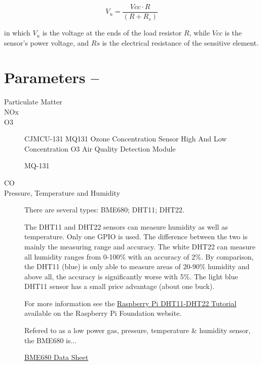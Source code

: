 \documentclass{article}\usepackage[]{graphicx}\usepackage[]{color}
\begin{document}
\begin{equation} 
V_u = \frac{Vcc \cdot R}{(R+R_s)}
\end{equation}
 
in which $V_u$ is the voltage at the ends of the load resistor $R$, while $Vcc$ is the sensor's power voltage, and $Rs$ is the electrical resistance of the sensitive element.

\section{Parameters -- }

\begin{description}

\item[Particulate Matter]

\item[NOx]

\item[O3]

CJMCU-131 MQ131 Ozone Concentration Sensor High And Low Concentration O3 Air Quality Detection Module 

MQ-131

\item[CO]

\item[Pressure, Temperature and Humidity]

There are several types: BME680; DHT11; DHT22.


The DHT11 and DHT22 sensors can measure humidity as well as temperature. Only one GPIO is used. The difference between the two is mainly the measuring range and accuracy. The white DHT22 can measure all humidity ranges from 0-100\% with an accuracy of 2\%. By comparison, the DHT11 (blue) is only able to measure areas of 20-90\% humidity and above all, the accuracy is significantly worse with 5\%. The light blue DHT11 sensor has a small price advantage (about one buck).

For more information see the \href{https://tutorials-raspberrypi.com/raspberry-pi-measure-humidity-temperature-dht11-dht22/}{Raspberry Pi DHT11-DHT22 Tutorial} available on the Raspberry Pi Foundation website.

Refered to as a low power gas, pressure, temperature \& humidity sensor, the BME680 is...

\href{https://cdn-shop.adafruit.com/product-files/3660/BME680.pdf}{BME680 Data Sheet}

\end{description}
\end{document}
